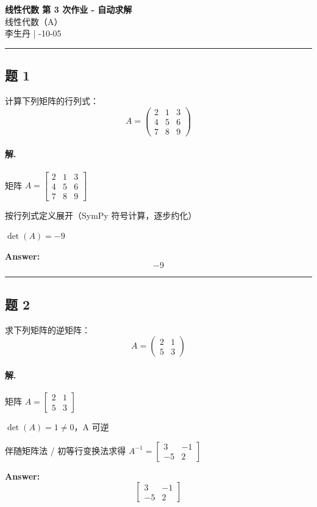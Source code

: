 \documentclass[12pt, a4paper]{article}
\newcommand{\problem}[1]{\subsection*{题 #1}}
\newcommand{\solution}{\paragraph{解.}}
\begin{document}
\begin{center}
    {\LARGE\bfseries 线性代数 第 3 次作业 - 自动求解} \\[0.5em]
    {\large 线性代数（A）} \\[0.3em]
    李生丹 \quad | -10-05
\end{center}

\hrule
\vspace{1em}
\problem{1}

计算下列矩阵的行列式：
$$A = \begin{pmatrix} 2 & 1 & 3 \\ 4 & 5 & 6 \\ 7 & 8 & 9 \end{pmatrix}$$

\solution

矩阵 $A = \left[\begin{matrix}2 & 1 & 3\\4 & 5 & 6\\7 & 8 & 9\end{matrix}\right]$

按行列式定义展开（SymPy 符号计算，逐步约化）

$\det(A) = -9$

\textbf{Answer:}
\[\boxed{-9}\]

\vspace{1em}
\hrule
\vspace{1em}

\problem{2}

求下列矩阵的逆矩阵：
$$A = \begin{pmatrix} 2 & 1 \\ 5 & 3 \end{pmatrix}$$

\solution

矩阵 $A = \left[\begin{matrix}2 & 1\\5 & 3\end{matrix}\right]$

$\det(A) = 1 \neq 0$，A 可逆

伴随矩阵法 / 初等行变换法求得 $A^{-1} = \left[\begin{matrix}3 & -1\\-5 & 2\end{matrix}\right]$

\textbf{Answer:}
\[\boxed{\left[\begin{matrix}3 & -1\\-5 & 2\end{matrix}\right]}\]
\end{document}
